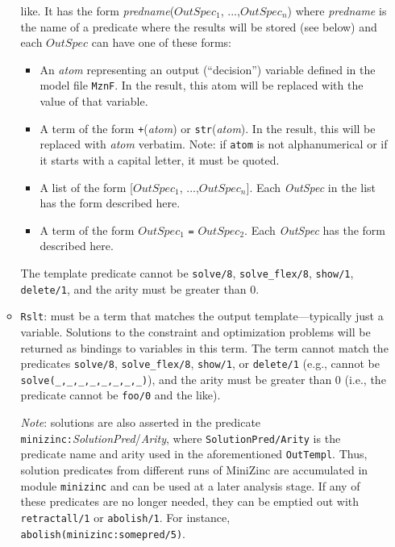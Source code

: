 \begin{itemize}
\begin{itemize}
    like. It has the form \emph{predname}($OutSpec_1$, ...,$OutSpec_n$)
    where \emph{predname} is the name of a predicate
    where the results will be stored (see below)
    and each $OutSpec$ can have one of these forms:
    \begin{itemize}
    \item  An \emph{atom} representing an output (``decision'') variable
      defined in the model file \texttt{MznF}.
      In the result, this atom will be replaced with the value of that variable.
    \item  A term of the form \texttt{+}(\emph{atom}) or
      \texttt{str}(\emph{atom}).  In the result, this will be replaced with
      \emph{atom} verbatim. Note: if \texttt{atom} is not alphanumerical or
      if it starts with a capital letter, it must be quoted.

    \item A list of the form [$OutSpec_1$, ...,$OutSpec_n$]. Each
      \emph{OutSpec} in the list has the form
      described here.
    \item A term of the form $OutSpec_1$ \texttt{=} $OutSpec_2$. Each
      \emph{OutSpec} has the form described here.
    \end{itemize}
    The template predicate cannot be \texttt{solve/8}, \texttt{solve\_flex/8},
    \texttt{show/1}, \texttt{delete/1},
    and the arity must be greater than 0.  
  \item \texttt{Rslt}: must be a term that matches the output
    template---typically just a variable.  Solutions to the constraint and
    optimization problems will be returned as bindings to variables in this
    term.  The term cannot match the predicates \texttt{solve/8},
    \texttt{solve\_flex/8}, \texttt{show/1}, or \texttt{delete/1} (e.g.,
    cannot be \texttt{solve(\_,\_,\_,\_,\_,\_,\_,\_)}), and the arity must
    be greater than 0 (i.e., the predicate cannot be \texttt{foo/0} and the
    like).

    \emph{Note}: solutions are also asserted in the predicate
    \texttt{minizinc:}\emph{SolutionPred}/\emph{Arity}, where
    \texttt{SolutionPred/Arity} is the predicate name and arity used in
    the aforementioned
    \texttt{OutTempl}.  Thus, solution predicates from different runs of
    MiniZinc are accumulated  in module \texttt{minizinc} and can be used
    at a later analysis stage. If any of these predicates are no longer
    needed, they can be emptied out with \texttt{retractall/1} or
    \texttt{abolish/1}. 
    For instance, \texttt{abolish(minizinc:somepred/5)}. 


\end{itemize}
\end{itemize}
